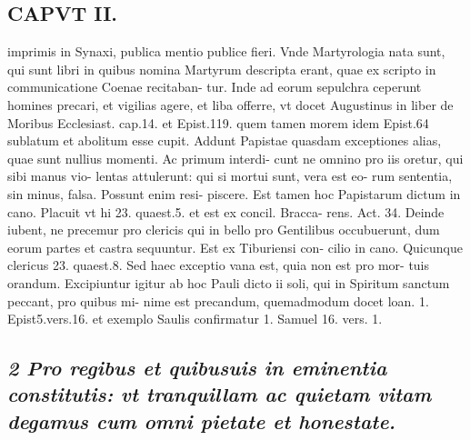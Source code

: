 \documentclass{article}
\begin{document}
\begin{pages}
\section*{CAPVT II. }
\marginpar{[ p.47 ]}\pstart imprimis in Synaxi, publica mentio publice fieri. Vnde Martyrologia nata sunt, qui sunt libri in quibus nomina Martyrum descripta erant, quae ex scripto in communicatione Coenae recitaban- tur. Inde ad eorum sepulchra ceperunt homines precari, et vigilias agere, et liba offerre, vt docet Augustinus in liber  de Moribus Ecclesiast. cap.14. et Epist.119. quem tamen morem idem Epist.64 sublatum et abolitum esse cupit.  \pend\pstart Addunt Papistae quasdam exceptiones alias, quae sunt nullius momenti. Ac primum interdi- cunt ne omnino pro iis oretur, qui sibi manus vio- lentas attulerunt: qui si mortui sunt, vera est eo- rum sententia, sin minus, falsa. Possunt enim resi- piscere. Est tamen hoc Papistarum dictum in cano. Placuit vt hi 23. quaest.5. et est ex concil. Bracca- rens. Act. 34.  \pend\pstart Deinde iubent, ne precemur pro clericis qui in bello pro Gentilibus occubuerunt, dum eorum partes et castra sequuntur. Est ex Tiburiensi con- cilio in cano. Quicunque clericus 23. quaest.8. Sed haec exceptio vana est, quia non est pro mor- tuis orandum.  \pend\pstart Excipiuntur igitur ab hoc Pauli dicto ii soli, qui in Spiritum sanctum peccant, pro quibus mi- nime est precandum, quemadmodum docet loan. 1. Epist5.vers.16. et exemplo Saulis confirmatur 1. Samuel 16. vers. 1.  \pend
{}
{}
\subsection*{\textit{2 Pro regibus et quibusuis in eminentia constitutis: vt tranquillam ac quietam vitam degamus cum omni pietate et honestate. }}

\end{pages}
\end{document}
